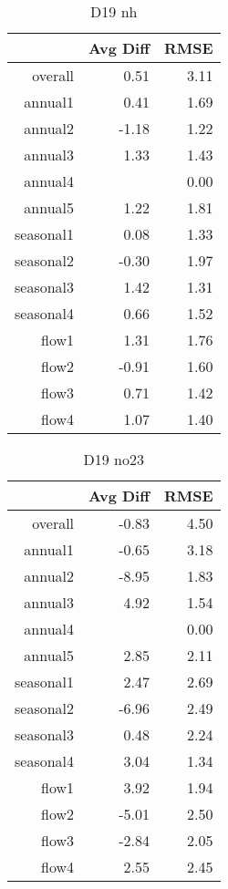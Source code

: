 \begin{table}[H]
\centering
\begin{tabular}{rrr}
  \hline
 & Avg Diff & RMSE \\ 
  \hline
overall & 0.51 & 3.11 \\ 
  annual1 & 0.41 & 1.69 \\ 
  annual2 & -1.18 & 1.22 \\ 
  annual3 & 1.33 & 1.43 \\ 
  annual4 &  & 0.00 \\ 
  annual5 & 1.22 & 1.81 \\ 
  seasonal1 & 0.08 & 1.33 \\ 
  seasonal2 & -0.30 & 1.97 \\ 
  seasonal3 & 1.42 & 1.31 \\ 
  seasonal4 & 0.66 & 1.52 \\ 
  flow1 & 1.31 & 1.76 \\ 
  flow2 & -0.91 & 1.60 \\ 
  flow3 & 0.71 & 1.42 \\ 
  flow4 & 1.07 & 1.40 \\ 
   \hline
\end{tabular}
\caption{D19 nh} 
\end{table}
\begin{table}[H]
\centering
\begin{tabular}{rrr}
  \hline
 & Avg Diff & RMSE \\ 
  \hline
overall & -0.83 & 4.50 \\ 
  annual1 & -0.65 & 3.18 \\ 
  annual2 & -8.95 & 1.83 \\ 
  annual3 & 4.92 & 1.54 \\ 
  annual4 &  & 0.00 \\ 
  annual5 & 2.85 & 2.11 \\ 
  seasonal1 & 2.47 & 2.69 \\ 
  seasonal2 & -6.96 & 2.49 \\ 
  seasonal3 & 0.48 & 2.24 \\ 
  seasonal4 & 3.04 & 1.34 \\ 
  flow1 & 3.92 & 1.94 \\ 
  flow2 & -5.01 & 2.50 \\ 
  flow3 & -2.84 & 2.05 \\ 
  flow4 & 2.55 & 2.45 \\ 
   \hline
\end{tabular}
\caption{D19 no23} 
\end{table}
